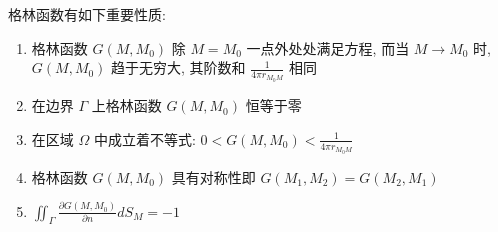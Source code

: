\documentclass[10pt]{yerbaformat}
\begin{document}
\par 格林函数有如下重要性质:
\begin{enumerate}
    \item 格林函数 $G\left(M, M_{0}\right)$ 除 $M=M_{0}$ 一点外处处满足方程, 而当 $M \rightarrow M_{0}$ 时, $G\left(M, M_{0}\right)$ 趋于无穷大, 其阶数和 $\frac{1}{4 \pi r_{M_{0}M}}$ 相同
    \item 在边界 $\Gamma$ 上格林函数 $G\left(M, M_{0}\right)$ 恒等于零
    \item 在区域 $\Omega$ 中成立着不等式: $ 0<G\left(M, M_{0}\right)<\frac{1}{4 \pi r_{M_{0} M}}$
    \item 格林函数 $G\left(M, M_{0}\right)$ 具有对称性即 $ G\left(M_{1}, M_{2}\right)=G\left(M_{2}, M_{1}\right)$
    \item $\iint_{\Gamma} \frac{\partial G\left(M, M_{0}\right)}{\partial n} d S_{M}=-1$
\end{enumerate}





\end{document}
